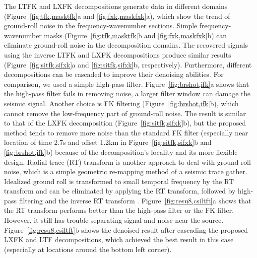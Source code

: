 The LTFK and LXFK decompositions generate data
in different domains (Figure~\ref{fig:tfk,masktfk}a and
\ref{fig:fxk,maskfxk}a), which show the trend of ground-roll noise in
the frequency-wavenumber sections. Simple frequency-wavenumber masks
(Figure~\ref{fig:tfk,masktfk}b and
\ref{fig:fxk,maskfxk}b) can eliminate ground-roll noise in the
decomposition domains. The recovered signals using the inverse LTFK
and LXFK decompositions produce similar results
(Figure~\ref{fig:sitfk,sifxk}a and
\ref{fig:sitfk,sifxk}b, respectively). Furthermore, different
decompositions can be cascaded to improve their
denoising abilities. For comparison, we used a simple high-pass
filter. Figure~\ref{fig:brshot,ifk}a shows that the high-pass filter
fails in removing noise, a larger filter window can
damage the seismic signal. Another choice is FK filtering
(Figure~\ref{fig:brshot,ifk}b), which cannot remove the low-frequency
part of ground-roll noise. The result is similar to that of the LXFK
decomposition (Figure~\ref{fig:sitfk,sifxk}b),
but the proposed method tends to remove more noise than the standard
FK filter (especially near location of time 2.7s and offset 1.2km
in Figure~\ref{fig:sitfk,sifxk}b and
\ref{fig:brshot,ifk}b) because of the
decomposition's locality and its more flexible design. Radial trace
(RT) transform is another approach to deal with ground-roll noise,
which is a simple geometric re-mapping method of a seismic trace
gather. Idealized ground roll is transformed to small temporal
frequency by the RT transform and can be eliminated by applying the RT
transform, followed by high-pass filtering and the inverse RT
transform
\cite[]{Claerbout83,Henley99}. Figure~\ref{fig:resu8,csiltft}a shows
that the RT transform performs better than the high-pass filter or the
FK filter. However, it still has trouble separating signal and noise
near the source. Figure~\ref{fig:resu8,csiltft}b shows the denoised
result after cascading the proposed LXFK and LTF decompositions, which
achieved the best result in this case (especially at locations around
the bottom left corner).

